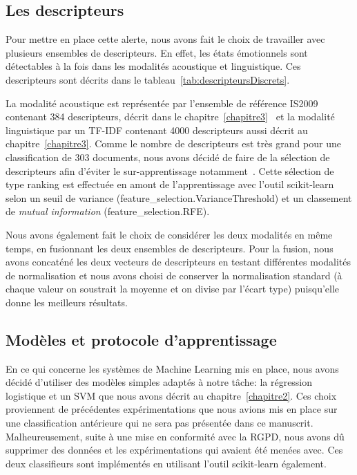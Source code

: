 \subsection{Les descripteurs}
Pour mettre en place cette alerte, nous avons fait le choix de travailler avec plusieurs ensembles de descripteurs. En effet, les états émotionnels sont détectables à la fois dans les modalités acoustique et linguistique. Ces descripteurs sont décrits dans le tableau~\ref{tab:descripteursDiscrets}.




La modalité acoustique est représentée par l'ensemble de référence IS2009 contenant 384 descripteurs, décrit dans le chapitre~\ref{chapitre3}~\cite{OPENSMILE} et la modalité linguistique par un TF-IDF contenant 4000 descripteurs aussi décrit au chapitre~\ref{chapitre3}. Comme le nombre de descripteurs est très grand pour une classification de 303 documents, nous avons décidé de faire de la sélection de descripteurs afin d'éviter le sur-apprentissage notamment~\cite{Tahon2016}. Cette sélection de type ranking est effectuée en amont de l'apprentissage avec l'outil scikit-learn~\cite{scikitlearn} selon un seuil de variance (feature\_selection.VarianceThreshold) et un classement de \textit{mutual information} (feature\_selection.RFE).

Nous avons également fait le choix de considérer les deux modalités en même temps, en fusionnant les deux ensembles de descripteurs. Pour la fusion, nous avons concaténé les deux vecteurs de descripteurs en testant différentes modalités de normalisation et nous avons choisi de conserver la normalisation standard (à chaque valeur on soustrait la moyenne et on divise par l'écart type) puisqu'elle donne les meilleurs résultats.

\subsection{Modèles et protocole d'apprentissage}
En ce qui concerne les systèmes de Machine Learning mis en place, nous avons décidé d'utiliser des modèles simples adaptés à notre tâche: la régression logistique et un SVM que nous avons décrit au chapitre~\ref{chapitre2}.
Ces choix proviennent de précédentes expérimentations que nous avions mis en place sur une classification antérieure qui ne sera pas présentée dans ce manuscrit.
Malheureusement, suite à une mise en conformité avec la RGPD, nous avons dû supprimer des données et les expérimentations qui avaient été menées avec. Ces deux classifieurs sont implémentés en utilisant l'outil scikit-learn également. %

